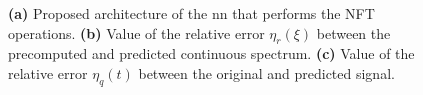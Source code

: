 \begin{figure}[tb]
\begin{minipage}[h]{0.27\linewidth}
{    }
    \end{minipage}
    \hfill
    \begin{minipage}[h]{0.72\linewidth}
        \begin{minipage}[h]{1.0\linewidth}
        \end{minipage}
        \vfill
        \begin{minipage}[h]{1.0\linewidth}
        \end{minipage}
    \end{minipage}
    \caption{\textbf{(a)} Proposed architecture of the \acrshort{nn} that performs the NFT operations. \textbf{(b)} Value of the relative error $\eta_r(\xi)$ between the precomputed and predicted continuous spectrum. \textbf{(c)} Value of the relative error $\eta_q(t)$ between the original and predicted signal.}
    \label{fig:arch_and_result_nn_nft}
\end{figure}

